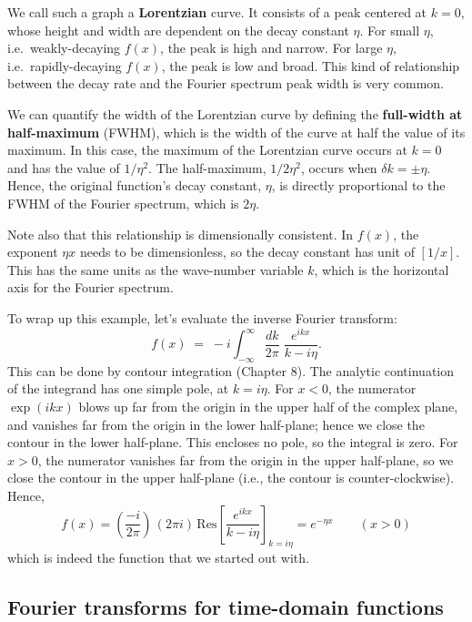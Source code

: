 \documentclass[10pt,a4paper]{article}
\begin{document}
We call such a graph a \textbf{Lorentzian} curve.  It consists of a
peak centered at $k = 0$, whose height and width are dependent on the
decay constant $\eta$. For small $\eta$, i.e.~weakly-decaying $f(x)$,
the peak is high and narrow. For large $\eta$, i.e.~rapidly-decaying
$f(x)$, the peak is low and broad. This kind of relationship between
the decay rate and the Fourier spectrum peak width is very common.

    
We can quantify the width of the Lorentzian curve by defining the
\textbf{full-width at half-maximum} (FWHM), which is the width of the
curve at half the value of its maximum. In this case, the maximum of
the Lorentzian curve occurs at $k=0$ and has the value of $1/\eta^2$.
The half-maximum, $1/2\eta^2$, occurs when $\delta k = \pm \eta$.
Hence, the original function's decay constant, $\eta$, is directly
proportional to the FWHM of the Fourier spectrum, which is $2\eta$.

Note also that this relationship is dimensionally consistent. In
$f(x)$, the exponent $\eta x$ needs to be dimensionless, so the decay
constant has unit of $[1/x]$. This has the same units as the
wave-number variable $k$, which is the horizontal axis for the Fourier
spectrum.

To wrap up this example, let's evaluate the inverse Fourier transform:
\begin{equation}
  f(x) \; = \; -i\int_{-\infty}^\infty \frac{dk}{2\pi} \; \frac{e^{i kx}}{k-i\eta}.
\end{equation}
This can be done by contour integration (Chapter 8). The analytic
continuation of the integrand has one simple pole, at $k = i\eta$. For
$x < 0$, the numerator $\exp(ikx)$ blows up far from the origin in the
upper half of the complex plane, and vanishes far from the origin in
the lower half-plane; hence we close the contour in the lower
half-plane. This encloses no pole, so the integral is zero. For $x >
0$, the numerator vanishes far from the origin in the upper
half-plane, so we close the contour in the upper half-plane (i.e., the
contour is counter-clockwise). Hence,
\begin{equation}
  f(x) = \left(\frac{-i}{2\pi}\right) \, \left(2\pi i\right)
  \, \mathrm{Res}\left[ \frac{e^{ikx}}{k-i\eta}\right]_{k=i\eta} = e^{-\eta x} \qquad(x > 0)
\end{equation}
which is indeed the function that we started out with.

\subsection{Fourier transforms for time-domain functions}
\label{fourier_time}
\end{document}

